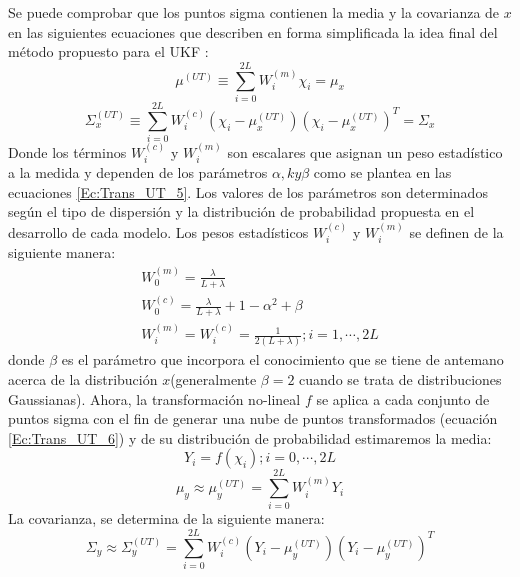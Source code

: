 Se puede comprobar que los puntos sigma contienen la media y la covarianza de $x$ en las siguientes ecuaciones que describen en forma simplificada la idea final del método propuesto para el \ac{UKF} \cite{julier_unscented_2004}:
\begin{equation}\label{Ec:Trans_UT_3}
\mu^{(UT)} \equiv \sum_{i=0}^{2L} W_{i}^{(m)}\chi_{i}= \mu_{x}
\end{equation}
\begin{equation}\label{Ec:Trans_UT_4}
\Sigma_{x}^{(UT)} \equiv \sum_{i=0}^{2L} W_{i}^{(c)}(\chi_{i}-\mu_{x}^{(UT)})(\chi_{i}-\mu_{x}^{(UT)})^{T} = \Sigma_{x}
\end{equation}
Donde los términos $W_{i}^{(c)}$ y $W_{i}^{(m)}$ son escalares que asignan un peso estadístico a la medida y dependen de los parámetros $\alpha ,k y \beta$ como se plantea en las ecuaciones \ref{Ec:Trans_UT_5}.
Los valores de los parámetros son determinados según el tipo de dispersión y la distribución de probabilidad propuesta en el desarrollo de cada modelo.
Los pesos estadísticos $W_{i}^{(c)}$ y $W_{i}^{(m)}$ se definen de la siguiente manera:
\begin{eqnarray}\label{Ec:Trans_UT_5}
\nonumber W_{0}^{(m)}= \frac{\lambda}{L+\lambda} \\
\nonumber W_{0}^{(c)}= \frac{\lambda}{L+\lambda} + 1-\alpha^{2}+\beta  \\
W_{i}^{(m)} = W_{i}^{(c)} = \frac{1}{2(L+\lambda)} ; i=1,\cdots,2L
\end{eqnarray}
donde $\beta$ es el parámetro que incorpora el conocimiento que se tiene de antemano acerca de la distribución $x$(generalmente $\beta=2$ cuando se trata de distribuciones Gaussianas).
Ahora, la transformación no-lineal $f$ se aplica a cada conjunto de puntos sigma con el fin de generar una nube de puntos transformados (ecuación \ref{Ec:Trans_UT_6}) y de su distribución de probabilidad estimaremos la media:
\begin{equation}\label{Ec:Trans_UT_6}
Y_{i} = f(\chi_{i}); i=0,\cdots,2L
\end{equation}
\begin{equation}\label{Ec:Trans_UT_7}
\mu_{y} \approx \mu_{y}^{(UT)} = \sum_{i=0}^{2L}W_{i}^{(m)}Y_{i}
\end{equation}
La covarianza, se determina de la siguiente manera:
\begin{equation}\label{Ec:Trans_UT_8}
\Sigma_{y} \approx \Sigma_{y}^{(UT)} = \sum_{i=0}^{2L} W_{i}^{(c)}(Y_{i}-\mu_{y}^{(UT)})(Y_{i}-\mu_{y}^{(UT)})^{T}
\end{equation}
